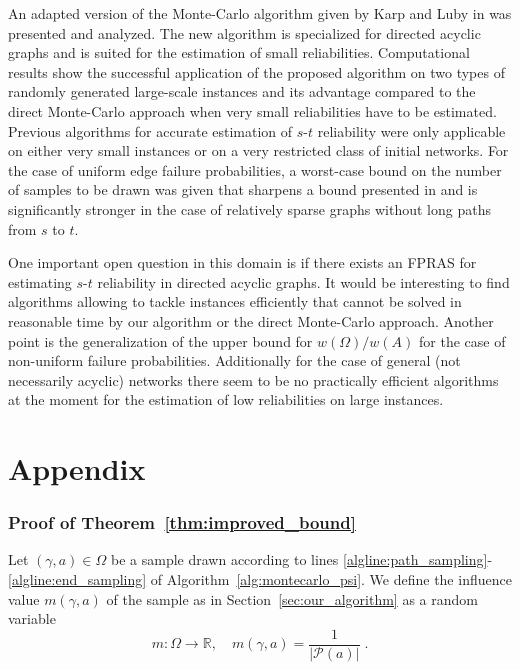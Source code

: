 \documentclass{article}
\newcommand\Real{\mathbb{R}}
\begin{document}
An adapted version of the Monte-Carlo algorithm given by Karp and Luby
in \cite{karp_1985_montecarlo} was presented and analyzed.
The new algorithm is specialized for directed acyclic graphs and is suited for the estimation
of small reliabilities. Computational results show the successful
application of the proposed algorithm on two types of randomly
generated large-scale instances 
and its advantage compared to the direct \mbox{Monte-Carlo} approach
when very small reliabilities have to be estimated.
Previous algorithms for accurate estimation of $s$-$t$ reliability
were only applicable on either very small instances or on
a very restricted class of initial networks.
For the case of uniform
edge failure probabilities, a \mbox{worst-case} bound
on the number of samples to be drawn was given that sharpens a bound presented in
\cite{karp_1985_montecarlo} and is significantly stronger in the case of
relatively sparse graphs without long paths from $s$ to $t$.


One important open question in this domain is if there exists an FPRAS
for estimating $s$-$t$ reliability in directed acyclic graphs. It would be interesting to
find algorithms allowing to tackle instances
efficiently that cannot be solved in reasonable time by our algorithm or the
direct \mbox{Monte-Carlo} approach.
Another point is the generalization of the upper bound for $w(\Omega)/w(A)$
for the case of \mbox{non-uniform} failure probabilities.
Additionally for the case of general (not necessarily acyclic) networks
there seem to be no practically efficient algorithms at the moment for the
estimation of low reliabilities on large instances.







\section*{Appendix}

\subsubsection*{Proof of Theorem~\ref{thm:improved_bound}}

Let $(\gamma,a) \in \Omega$ be a
sample drawn
according to lines
\mbox{\ref{algline:path_sampling}-\ref{algline:end_sampling}}
of \mbox{Algorithm~\ref{alg:montecarlo_psi}}. We define the
influence value $m(\gamma,a)$ of the sample as in
Section~\ref{sec:our_algorithm} as a random variable
\begin{equation*}
m: \Omega \longrightarrow \Real, \quad m(\gamma,a)=\frac{1}{|\mathcal{P}(a)|}\;.
\end{equation*}
\end{document}
